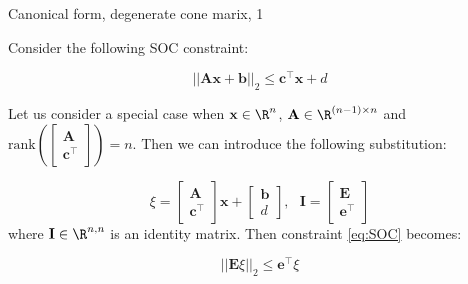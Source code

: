 \documentclass{beamer}
\begin{document}
\begin{frame}{Canonical form, degenerate cone marix, 1}
	\begin{flushleft}
		
		Consider the following SOC constraint:
		
		\begin{equation}
			\label{eq:SOC}
			||\mathbf{A}\mathbf{x} + \mathbf{b}||_2 \leq 
			\mathbf{c}^\top \mathbf{x} + d
		\end{equation}
		
		Let us consider a special case when $\mathbf{x} \in \R^n$, $\mathbf{A} \in \R^{(n-1) \times n}$ and $\text{rank}\left(\begin{bmatrix}
			\mathbf{A} \\ \mathbf{c}^\top
		\end{bmatrix}\right) = n$. Then we can introduce the following substitution:
		
		\begin{equation}
			\xi = \begin{bmatrix}
				\mathbf{A} \\ \mathbf{c}^\top
			\end{bmatrix}
			\mathbf{x} + 
			\begin{bmatrix}
				\mathbf{b} \\ d
			\end{bmatrix}, 
			\ \ \ 
			\mathbf{I} = 
			\begin{bmatrix}
				\mathbf{E} \\ \mathbf{e}^\top
			\end{bmatrix}
		\end{equation}
		where $\mathbf{I} \in\R^{n, n}$ is an identity matrix. Then constraint \eqref{eq:SOC} becomes:
		
		\begin{equation}
			||\mathbf{E}\xi||_2 \leq 
			\mathbf{e}^\top \xi
		\end{equation}
		
	\end{flushleft}
\end{frame}
\end{document}
